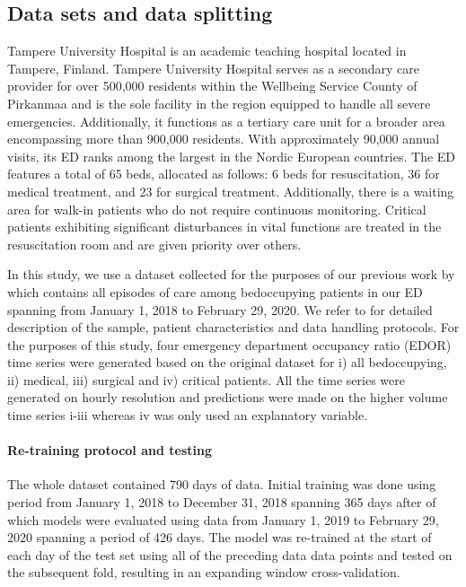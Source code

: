 \subsection{Data sets and data splitting} 

Tampere University Hospital is an academic teaching hospital located in Tampere, Finland. Tampere University Hospital serves as a secondary care provider for over 500,000 residents within the Wellbeing Service County of Pirkanmaa and is the sole facility in the region equipped to handle all severe emergencies. Additionally, it functions as a tertiary care unit for a broader area encompassing more than 900,000 residents. With approximately 90,000 annual visits, its ED ranks among the largest in the Nordic European countries. The ED features a total of 65 beds, allocated as follows: 6 beds for resuscitation, 36 for medical treatment, and 23 for surgical treatment. Additionally, there is a waiting area for walk-in patients who do not require continuous monitoring. Critical patients exhibiting significant disturbances in vital functions are treated in the resuscitation room and are given priority over others.

In this study, we use a dataset collected for the purposes of our previous work by \citet{Eidsto2023} which contains all episodes of care among bedoccupying patients in our ED spanning from January 1, 2018 to February 29, 2020. We refer to \citet{Eidsto2023} for detailed description of the sample, patient characteristics and data handling protocols. For the purposes of this study, four emergency department occupancy ratio (EDOR) time series were generated based on the original dataset for i) all bedoccupying, ii) medical, iii) surgical and iv) critical patients. All the time series were generated on hourly resolution and predictions were made on the higher volume time series i-iii whereas iv was only used an explanatory variable.

\paragraph{Re-training protocol and testing}

The whole dataset contained 790 days of data. Initial training was done using period from January 1, 2018 to December 31, 2018 spanning 365 days after of which models were evaluated using data from January 1, 2019 to February 29, 2020 spanning a period of 426 days. The model was re-trained at the start of each day of the test set using all of the preceding data data points and tested on the subsequent fold, resulting in an expanding window cross-validation.

